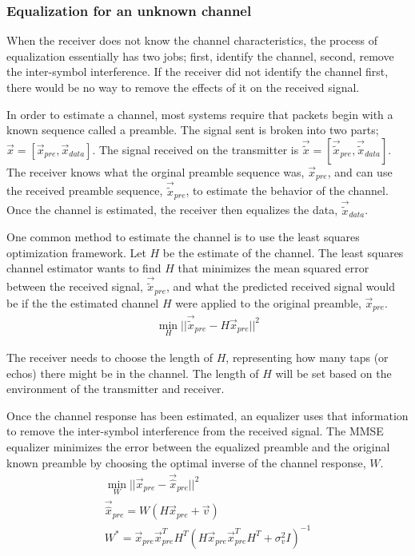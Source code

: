\subsubsection{Equalization for an unknown channel}
When the receiver does not know the channel characteristics, the process of equalization essentially has two jobs; first, identify the channel, second, remove the inter-symbol interference. If the receiver did not identify the channel first, there would be no way to remove the effects of it on the received signal. 

In order to estimate a channel, most systems require that packets begin with a known sequence called a preamble. The signal sent is broken into two parts; $\vec{x} = [\vec{x}_{pre}, \vec{x}_{data}]$.  The signal received on the transmitter is $\vec{\tilde{x}}=[\vec{\tilde{x}}_{pre},\vec{\tilde{x}}_{data}]$.  
The receiver knows what the orginal preamble sequence was, $\vec{x}_{pre}$, and can use the received preamble sequence, $\vec{\tilde{x}}_{pre}$, to estimate the behavior of the channel.
Once the channel is estimated, the receiver then equalizes the data, $\vec{\tilde{x}}_{data}$.

One common method to estimate the channel is to use the least squares optimization framework. Let $H$ be the estimate of the channel.  The least squares channel estimator wants to find $H$ that minimizes the mean squared error between the received signal, $\vec{\tilde{x}}_{pre}$, and what the predicted received signal would be if the the estimated channel $H$ were applied to the original preamble, $\vec{x}_{pre}$.
\begin{align}
\min_H ||\vec{\tilde{x}}_{pre}-H\vec{x}_{pre}||^2
\end{align}

The receiver needs to choose the length of $H$, representing how many taps (or echos) there might be in the channel.  The length of $H$ will be set based on the environment of the transmitter and receiver.

Once the channel response has been estimated, an equalizer uses that information to remove the inter-symbol interference from the received signal.
The MMSE equalizer minimizes the error between the equalized preamble and the original known preamble by choosing the optimal inverse of the channel response, $W$.
\begin{align}
\min_W||\vec{x}_{pre}-\vec{\hat{x}}_{pre}||^2 \\
\vec{\hat{x}}_{pre} = W (H\vec{x}_{pre}+\vec{v}) \\
W^* = \vec{x}_{pre} \vec{x}_{pre}^T H^T (H \vec{x}_{pre} \vec{x}_{pre}^T H^T + \sigma_v^2 I)^{-1}
\end{align}

